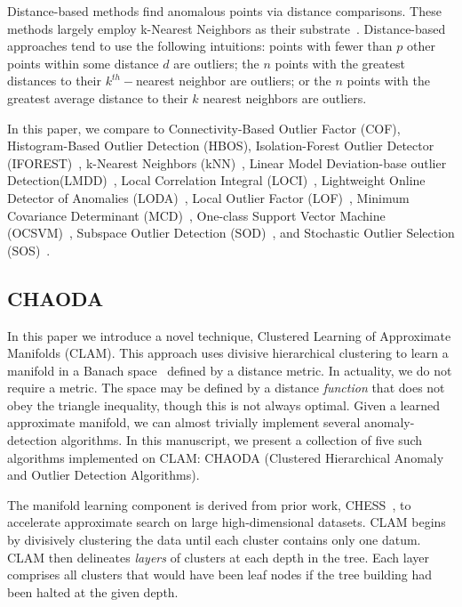 Distance-based methods find anomalous points via distance comparisons.
These methods largely employ k-Nearest Neighbors as their substrate~\cite{wang2019progress}.
Distance-based approaches tend to use the following intuitions:
points with fewer than $p$ other points within some distance $d$ are outliers;
the $n$ points with the greatest distances to their $k^{th}-$nearest neighbor are outliers;
or the $n$ points with the greatest average distance to their $k$ nearest neighbors are outliers.

In this paper, we compare to Connectivity-Based Outlier Factor (COF)\cite{tang2002cof}, Histogram-Based Outlier Detection (HBOS)\cite{goldstein2012hbos}, Isolation-Forest Outlier Detector (IFOREST)~\cite{tony2008iforest,tony2012iforest}, k-Nearest Neighbors (kNN)~\cite{ramaswamy2000efficient, sridhar2000knn, fabrizio2002knn}, Linear Model Deviation-base outlier Detection(LMDD)~\cite{arning1996lmdd}, Local Correlation Integral (LOCI)~\cite{papadimitriou2003loci}, Lightweight Online Detector of Anomalies (LODA)~\cite{pevny2016loda}, Local Outlier Factor (LOF)~\cite{breunig2000lof}, Minimum Covariance Determinant (MCD)~\cite{rousseeuw1999mcd,hardin2004mcd}, One-class Support Vector Machine (OCSVM)~\cite{sholkopf2001ocsvm}, Subspace Outlier Detection (SOD)~\cite{kriegel2009sod}, and Stochastic Outlier Selection (SOS)~\cite{janssens2012sos}.

\subsection{CHAODA}
\label{subsec:related-works:chaoda}

In this paper we introduce a novel technique, Clustered Learning of Approximate Manifolds (CLAM).
This approach uses divisive hierarchical clustering to learn a manifold in a Banach space~\cite{banach1929fonctionnelles} defined by a distance metric.
In actuality, we do not require a metric.
The space may be defined by a distance \textit{function} that does not obey the triangle inequality, though this is not always optimal.
Given a learned approximate manifold, we can almost trivially implement several anomaly-detection algorithms.
In this manuscript, we present a collection of five such algorithms implemented on CLAM: CHAODA (Clustered Hierarchical Anomaly and Outlier Detection Algorithms).

The manifold learning component is derived from prior work, CHESS~\cite{ishaq2019entropy}, to accelerate approximate search on large high-dimensional datasets.
CLAM begins by divisively clustering the data until each cluster contains only one datum.
CLAM then delineates \textit{layers} of clusters at each depth in the tree.
Each layer comprises all clusters that would have been leaf nodes if the tree building had been halted at the given depth.

